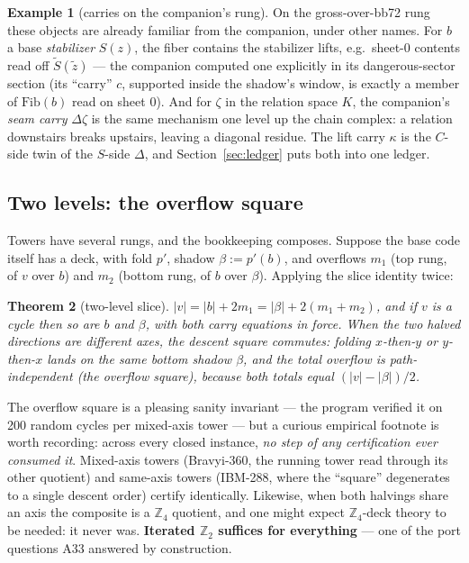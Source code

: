 \documentclass[11pt]{article}
\theoremstyle{plain}
\newtheorem{theorem}{Theorem}[section]
\theoremstyle{definition}
\newtheorem{example}[theorem]{Example}
\theoremstyle{remark}
\newcommand{\Z}{\mathbb{Z}}
\newcommand{\wt}[1]{\lvert #1\rvert}
\begin{document}
\begin{example}[carries on the companion's rung]\label{ex:carryfamiliar}
On the gross-over-bb72 rung these objects are already familiar from the
companion, under other names. For $b$ a base \emph{stabilizer} $S(z)$, the
fiber contains the stabilizer lifts, e.g.\ sheet-0 contents read off
$\widetilde S(\widetilde z)$ --- the companion computed one explicitly in
its dangerous-sector section (its ``carry'' $c$, supported inside the
shadow's window, is exactly a member of $\mathrm{Fib}(b)$ read on sheet
0). And for $\zeta$ in
the relation space $K$, the companion's \emph{seam carry} $\Delta\zeta$ is
the same mechanism one level up the chain complex: a relation downstairs
breaks upstairs, leaving a diagonal residue. The lift carry $\kappa$ is
the $C$-side twin of the $S$-side $\Delta$, and Section~\ref{sec:ledger}
puts both into one ledger.
\end{example}

\subsection{Two levels: the overflow square}
\label{sec:twolevel}

Towers have several rungs, and the bookkeeping composes. Suppose the base
code itself has a deck, with fold $p'$, shadow $\beta := p'(b)$, and
overflows $m_1$ (top rung, of $v$ over $b$) and $m_2$ (bottom rung, of $b$
over $\beta$). Applying the slice identity twice:

\begin{theorem}[two-level slice]\label{thm:twolevel}
$\wt{v} = \wt{b} + 2m_1 = \wt{\beta} + 2(m_1 + m_2)$, and if $v$ is a
cycle then so are $b$ and $\beta$, with both carry equations in force.
When the two halved directions are \emph{different} axes, the descent
square commutes: folding $x$-then-$y$ or $y$-then-$x$ lands on the same
bottom shadow $\beta$, and the \emph{total} overflow is path-independent
(the \emph{overflow square}), because both totals equal
$(\wt{v} - \wt{\beta})/2$.
\end{theorem}

The overflow square is a pleasing sanity invariant --- the program
verified it on 200 random cycles per mixed-axis tower --- but a curious
empirical footnote is worth recording: across every closed instance,
\emph{no step of any certification ever consumed it}. Mixed-axis towers
(Bravyi-360, the running tower read through its other quotient) and
same-axis towers (IBM-288, where the ``square'' degenerates to a single
descent order) certify identically. Likewise, when both halvings share an
axis the composite is a $\Z_4$ quotient, and one might expect
$\Z_4$-deck theory to be needed: it never was. \textbf{Iterated $\Z_2$
suffices for everything} --- one of the port questions A33 answered by
construction.
\end{document}
